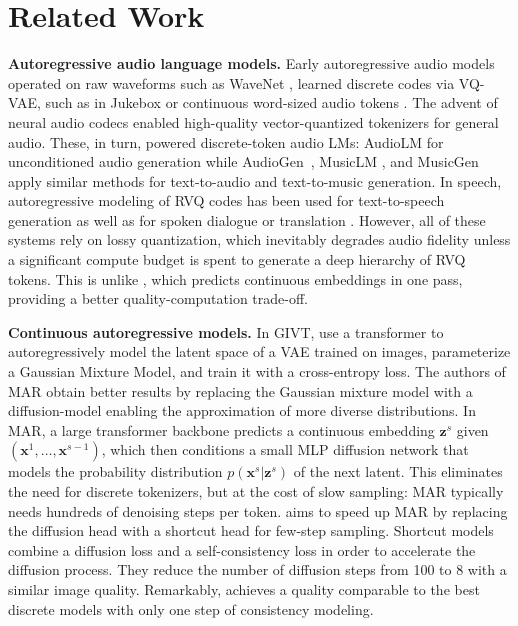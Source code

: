 
\section{Related Work}

\textbf{Autoregressive audio language models.} Early autoregressive audio models operated on raw waveforms such as WaveNet \citep{wavenet}, learned discrete codes via VQ-VAE, such as in Jukebox \citep{jukebox} or continuous word-sized audio tokens \citep{algayres2023generativespokenlanguagemodel}. The advent of neural audio codecs \citep{soundstream, encodec} enabled high-quality vector-quantized tokenizers for general audio. These, in turn, powered discrete-token audio LMs: AudioLM \citep{audiolm} for unconditioned audio generation while AudioGen~\citep{audiogen}, MusicLM \citep{musiclm}, and MusicGen \citep{musicgen} apply similar methods for text-to-audio and text-to-music generation. In speech, autoregressive modeling of RVQ codes has been used for text-to-speech generation \citep{valle, speartts} as well as for spoken dialogue \citep{moshi} or translation \citep{hibiki}. However, all of these systems rely on lossy quantization, which inevitably degrades audio fidelity unless a significant compute budget is spent to generate a deep hierarchy of RVQ tokens. This is unlike \ours{}, which predicts continuous embeddings in one pass, providing a better quality-computation trade-off.

\textbf{Continuous autoregressive models.} In GIVT, \citet{givt} use a transformer to autoregressively model the latent space of a VAE trained on images, parameterize a Gaussian Mixture Model, and train it with a cross-entropy loss. The authors of MAR \citep{autoreg_image_quant} obtain better results by replacing the Gaussian mixture model with a diffusion-model enabling the approximation of more diverse distributions. In MAR, a large transformer backbone predicts a continuous embedding $\mathbf{z}^s$ given $(\mathbf{x}^1, \ldots, \mathbf{x}^{s-1})$, which then conditions a small MLP diffusion network that models the probability distribution $p(\mathbf{x}^{s}|\mathbf{z}^s)$ of the next latent. 
This eliminates the need for discrete tokenizers, but at the cost of slow sampling: MAR typically needs hundreds of denoising steps per token. \citet{fast_MAR} aims to speed up MAR by replacing the diffusion head with a shortcut head \citep{shortcut_model} for few-step sampling. Shortcut models combine a diffusion loss and a self-consistency loss in order to accelerate the diffusion process. They reduce the number of diffusion steps from 100 to 8 with a similar image quality. Remarkably, \ours{} achieves a quality comparable to the best discrete models with only one step of consistency modeling.

